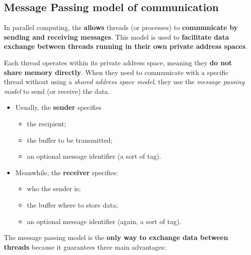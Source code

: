 \subsection{Message Passing model of communication}

In parallel computing, the  \textbf{allows} threads (or processes) to \textbf{communicate by sending and receiving messages}. This model is used to \textbf{facilitate data exchange between threads running in their own private address spaces}.

\highspace
Each thread operates within its private address space, meaning they \textbf{do not share memory directly}. When they need to communicate with a specific thread without using a \emph{shared address space model}, they use the \emph{message passing model} to send (or receive) the data.
\begin{itemize}
    \item Usually, the \textbf{sender} specifies
    \begin{itemize}
        \item the recipient;
        \item the buffer to be transmitted;
        \item an optional message identifier (a sort of tag).
    \end{itemize}
    \item Meanwhile, the \textbf{receiver} specifies:
    \begin{itemize}
        \item who the sender is;
        \item the buffer where to store data;
        \item an optional message identifier (again, a sort of tag).
    \end{itemize}
\end{itemize}
The message passing model is the \textbf{only way to exchange data between threads} because it guarantees three main advantages:
